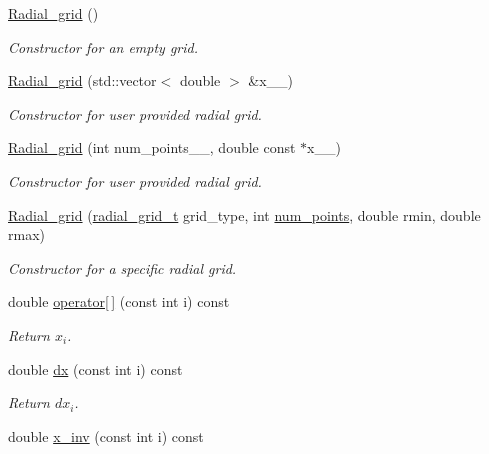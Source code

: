 \begin{DoxyCompactItemize}
\item 
\hyperlink{classsirius_1_1_radial__grid_ab8a33615324e5cc8b2426dbff0b07949}{Radial\+\_\+grid} ()
\begin{DoxyCompactList}\small\item\em Constructor for an empty grid. \end{DoxyCompactList}\item 
\hyperlink{classsirius_1_1_radial__grid_a726d50e7cb1b04543c82576fd421c2ba}{Radial\+\_\+grid} (std\+::vector$<$ double $>$ \&x\+\_\+\+\_\+)
\begin{DoxyCompactList}\small\item\em Constructor for user provided radial grid. \end{DoxyCompactList}\item 
\hyperlink{classsirius_1_1_radial__grid_ad95eb8181e1d7bed0b7c561ae82e426f}{Radial\+\_\+grid} (int num\+\_\+points\+\_\+\+\_\+, double const $\ast$x\+\_\+\+\_\+)
\begin{DoxyCompactList}\small\item\em Constructor for user provided radial grid. \end{DoxyCompactList}\item 
\hyperlink{classsirius_1_1_radial__grid_ae8c563c3381f4f4daa0b0af86a779058}{Radial\+\_\+grid} (\hyperlink{namespacesirius_a9c2875496b6736959baaf053c21dafb0}{radial\+\_\+grid\+\_\+t} grid\+\_\+type, int \hyperlink{classsirius_1_1_radial__grid_ae4775a4fff1a0852d934684d1939a824}{num\+\_\+points}, double rmin, double rmax)
\begin{DoxyCompactList}\small\item\em Constructor for a specific radial grid. \end{DoxyCompactList}\item 
double \hyperlink{classsirius_1_1_radial__grid_aa18251c2b1533c15ca0605bd0abd28a9}{operator\mbox{[}$\,$\mbox{]}} (const int i) const 
\begin{DoxyCompactList}\small\item\em Return $ x_{i} $. \end{DoxyCompactList}\item 
double \hyperlink{classsirius_1_1_radial__grid_ac43f80d43c1abc2892034e2e82d661ec}{dx} (const int i) const 
\begin{DoxyCompactList}\small\item\em Return $ dx_{i} $. \end{DoxyCompactList}\item 
double \hyperlink{classsirius_1_1_radial__grid_a33f818a3b5f561179542d85c8505998c}{x\+\_\+inv} (const int i) const 

\end{DoxyCompactItemize}
